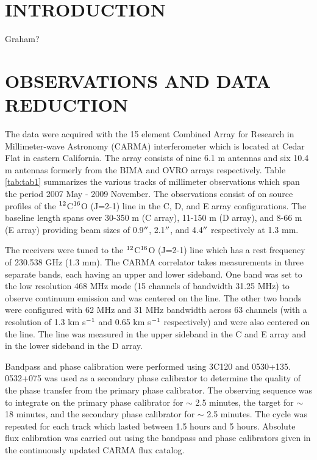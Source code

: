 \documentclass[preprint2]{aastex}
\begin{document}

\section{INTRODUCTION}

Graham?

\section{OBSERVATIONS AND DATA REDUCTION}

The data were acquired with the 15 element Combined Array for Research in Millimeter-wave Astronomy (CARMA) interferometer \citep{2004ASPC..314..768S} which is located at Cedar Flat in eastern California. The array consists of nine 6.1 m antennas and six 10.4 m antennas formerly from the BIMA and OVRO arrays respectively. Table \ref{tab:tab1} summarizes the various tracks of millimeter observations which span the period 2007 May - 2009 November. The observations consist of on source profiles of the $\rm{{}^{12}}$C$\rm{{}^{16}}$O (J=2-1) line in the C, D, and E array configurations. The baseline length spans over 30-350 m (C array), 11-150 m (D array), and 8-66 m (E array) providing beam sizes of 0.9$\mbox{$^{\prime\prime}$}$, 2.1$\mbox{$^{\prime\prime}$}$, and 4.4$\mbox{$^{\prime\prime}$}$ respectively at 1.3 mm. 

The receivers were tuned to the $\rm{{}^{12}}$C$\rm{{}^{16}}$O (J=2-1) line which has a rest frequency of 230.538 GHz (1.3 mm). The CARMA correlator takes measurements in three separate bands, each having an upper and lower sideband. One band was set to the low resolution 468 MHz mode (15 channels of bandwidth 31.25 MHz) to observe continuum emission and was centered on the line. The other two bands were configured with 62 MHz and 31 MHz bandwidth across 63 channels (with a resolution of 1.3 km s$\rm{{}^{-1}}$ and 0.65 km s$\rm{{}^{-1}}$ respectively) and were also centered on the line. The line was measured in the upper sideband in the C and E array and in the lower sideband in the D array.

Bandpass and phase calibration were performed using 3C120 and 0530+135. 0532+075 was used as a secondary phase calibrator to determine the quality of the phase transfer from the primary phase calibrator. The observing sequence was to integrate on the primary phase calibrator for $\sim$ 2.5 minutes, the target for $\sim$ 18 minutes, and the secondary phase calibrator for $\sim$ 2.5 minutes. The cycle was repeated for each track which lasted between 1.5 hours and 5 hours. Absolute flux calibration was carried out using the bandpass and phase calibrators given in the continuously updated CARMA flux catalog.
\end{document}
